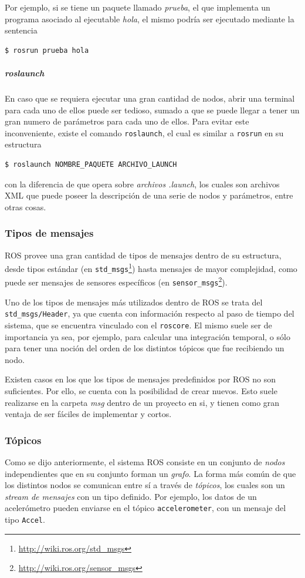 Por ejemplo, si se tiene un paquete llamado \textit{prueba}, el que implementa un programa asociado al ejecutable \textit{hola}, el mismo podría ser ejecutado mediante la sentencia
\begin{lstlisting}[language=bash]
  $ rosrun prueba hola
\end{lstlisting}

\subparagraph{roslaunch}
En caso que se requiera ejecutar una gran cantidad de nodos, abrir una terminal para cada uno de ellos puede ser tedioso, sumado a que se puede llegar a tener un gran numero de parámetros para cada uno de ellos. Para evitar este inconveniente, existe el comando \texttt{roslaunch}, el cual es similar a \texttt{rosrun} en su estructura
\begin{lstlisting}[language=bash]
  $ roslaunch NOMBRE_PAQUETE ARCHIVO_LAUNCH
\end{lstlisting}
con la diferencia de que opera sobre \textit{archivos .launch}, los cuales son archivos XML que puede poseer la descripción de una serie de nodos y parámetros, entre otras cosas.

\subsubsection{Tipos de mensajes}
ROS provee una gran cantidad de tipos de mensajes dentro de su estructura, desde tipos estándar (en \texttt{std\_msgs}\footnote{\url{http://wiki.ros.org/std_msgs}}) hasta mensajes de mayor complejidad, como puede ser mensajes de sensores específicos (en \texttt{sensor\_msgs}\footnote{\url{http://wiki.ros.org/sensor_msgs}}).

Uno de los tipos de mensajes más utilizados dentro de ROS se trata del \texttt{std\_msgs/Header}, ya que cuenta con información respecto al paso de tiempo del sistema, que se encuentra vinculado con el \texttt{roscore}. El mismo suele ser de importancia ya sea, por ejemplo, para calcular una integración temporal, o sólo para tener una noción del orden de los distintos tópicos que fue recibiendo un nodo.

Existen casos en los que los tipos de mensajes predefinidos por ROS no son suficientes. Por ello, se cuenta con la posibilidad de crear nuevos. Esto suele realizarse en la carpeta \textit{msg} dentro de un proyecto en si, y tienen como gran ventaja de ser fáciles de implementar y cortos.

\subsubsection{Tópicos}
Como se dijo anteriormente, el sistema ROS consiste en un conjunto de \textit{nodos} independientes que en su conjunto forman un \textit{grafo}. La forma más común de que los distintos nodos se comunican entre sí a través de \textit{tópicos}, los cuales son un \textit{stream de mensajes} con un tipo definido. Por ejemplo, los datos de un acelerómetro pueden enviarse en el tópico \texttt{accelerometer}, con un mensaje del tipo \texttt{Accel}. 

